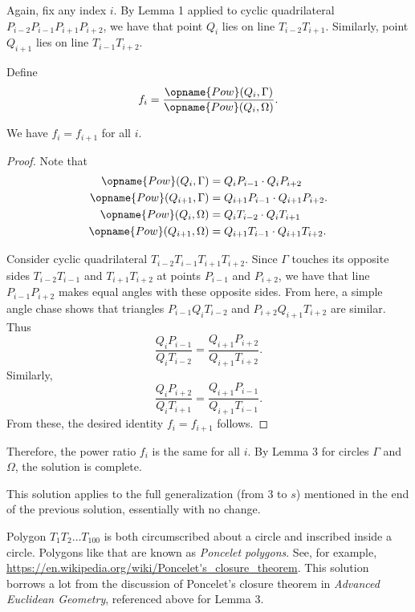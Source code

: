 \documentclass[11pt]{scrartcl}
\begin{document}
Again, fix any index $i$.
By Lemma 1 applied to cyclic quadrilateral $P_{i - 2}P_{i - 1}P_{i + 1}P_{i + 2}$,
we have that point $Q_i$ lies on line $T_{i - 2}T_{i + 1}$.
Similarly, point $Q_{i + 1}$ lies on line $T_{i - 1}T_{i + 2}$.


Define \[f_i = \frac{\opname{Pow}(Q_i, \Gamma)}{\opname{Pow}(Q_i, \Omega)}.\]
\begin{claim*}
  We have $f_i = f_{i + 1}$ for all $i$.
\end{claim*}
\begin{proof}
Note that
\begin{align*}
\opname{Pow}(Q_i, \Gamma)
  &= Q_iP_{i - 1} \cdot Q_iP_{i + 2} \\
\opname{Pow}(Q_{i + 1}, \Gamma)
  &= Q_{i + 1}P_{i - 1} \cdot Q_{i + 1}P_{i + 2}. \\
\opname{Pow}(Q_i, \Omega)
  &= Q_iT_{i - 2} \cdot Q_iT_{i + 1} \\
\opname{Pow}(Q_{i + 1}, \Omega)
  &= Q_{i + 1}T_{i - 1} \cdot Q_{i + 1}T_{i + 2}.
\end{align*}

Consider cyclic quadrilateral $T_{i - 2}T_{i - 1}T_{i + 1}T_{i + 2}$.
Since $\Gamma$ touches its opposite sides $T_{i - 2}T_{i - 1}$
and $T_{i + 1}T_{i + 2}$ at points $P_{i - 1}$ and $P_{i + 2}$,
we have that line $P_{i - 1}P_{i + 2}$
makes equal angles with these opposite sides.
From here, a simple angle chase shows
that triangles $P_{i - 1}Q_iT_{i - 2}$ and $P_{i + 2}Q_{i + 1}T_{i + 2}$
are similar.
Thus
\[\frac{Q_iP_{i - 1}}{Q_iT_{i - 2}} = \frac{Q_{i + 1}P_{i + 2}}{Q_{i + 1}T_{i + 2}}.\]
Similarly,
\[\frac{Q_iP_{i + 2}}{Q_iT_{i + 1}} = \frac{Q_{i + 1}P_{i - 1}}{Q_{i + 1}T_{i - 1}}.\]
From these, the desired identity $f_i = f_{i + 1}$ follows.
\end{proof}

Therefore, the power ratio $f_i$ is the same for all $i$.
By Lemma 3 for circles $\Gamma$ and $\Omega$, the solution is complete.

\begin{remark*}
  This solution applies to the full generalization (from $3$ to $s$)
  mentioned in the end of the previous solution,
  essentially with no change.
\end{remark*}

\begin{remark*}
  Polygon $T_1T_2 \dots T_{100}$ is both
  circumscribed about a circle and inscribed inside a circle.
  Polygons like that are known as \emph{Poncelet polygons}.
  See, for example, \url{https://en.wikipedia.org/wiki/Poncelet's_closure_theorem}.
  This solution borrows a lot from the discussion of
  Poncelet's closure theorem in \emph{Advanced Euclidean Geometry},
  referenced above for Lemma 3.
\end{remark*}
\pagebreak
\end{document}
